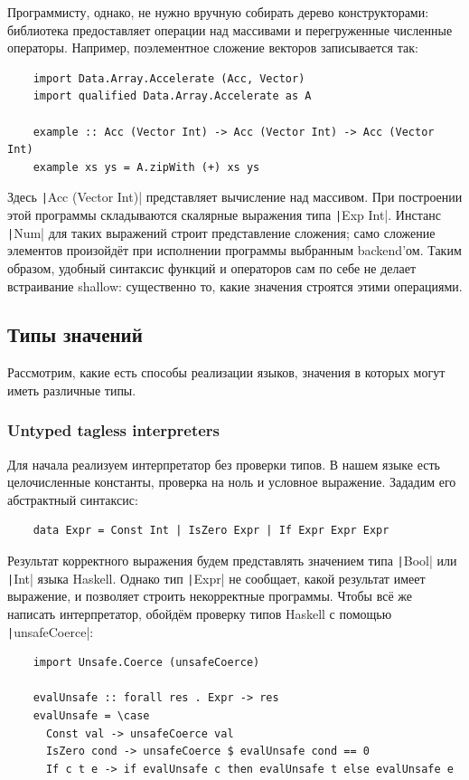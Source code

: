 Программисту, однако, не нужно вручную собирать дерево конструкторами: библиотека предоставляет операции над массивами и перегруженные численные операторы.
Например, поэлементное сложение векторов записывается так:
\begin{verbatim}
    import Data.Array.Accelerate (Acc, Vector)
    import qualified Data.Array.Accelerate as A

    example :: Acc (Vector Int) -> Acc (Vector Int) -> Acc (Vector Int)
    example xs ys = A.zipWith (+) xs ys
\end{verbatim}

Здесь \texttt|Acc (Vector Int)| представляет вычисление над массивом.
При построении этой программы складываются скалярные выражения типа \texttt|Exp Int|.
Инстанс \texttt|Num| для таких выражений строит представление сложения; само сложение элементов произойдёт при исполнении программы выбранным backend'ом.
Таким образом, удобный синтаксис функций и операторов сам по себе не делает встраивание shallow: существенно то, какие значения строятся этими операциями.

\subsection{Типы значений}

Рассмотрим, какие есть способы реализации языков, значения в которых могут иметь различные типы.

\subsubsection{Untyped tagless interpreters}

Для начала реализуем интерпретатор без проверки типов.
В нашем языке есть целочисленные константы, проверка на ноль и условное выражение.
Зададим его абстрактный синтаксис:
\begin{verbatim}
    data Expr = Const Int | IsZero Expr | If Expr Expr Expr
\end{verbatim}

Результат корректного выражения будем представлять значением типа \texttt|Bool| или \texttt|Int| языка Haskell.
Однако тип \texttt|Expr| не сообщает, какой результат имеет выражение, и позволяет строить некорректные программы.
Чтобы всё же написать интерпретатор, обойдём проверку типов Haskell с помощью \texttt|unsafeCoerce|:
\begin{verbatim}
    import Unsafe.Coerce (unsafeCoerce)

    evalUnsafe :: forall res . Expr -> res
    evalUnsafe = \case
      Const val -> unsafeCoerce val
      IsZero cond -> unsafeCoerce $ evalUnsafe cond == 0
      If c t e -> if evalUnsafe c then evalUnsafe t else evalUnsafe e
\end{verbatim}

